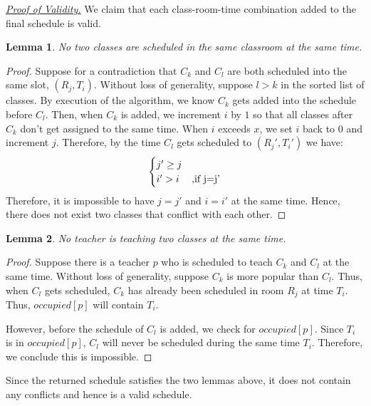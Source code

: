 \documentclass[11pt, oneside]{article}   	%
\newtheorem*{lem}{Lemma}
\begin{document}
\underline{\textit{Proof of Validity.}}
We claim that each class-room-time combination added to the final schedule is valid. \\ \par
\begin{lem}No two classes are scheduled in the same classroom at the same time.\end{lem}
\begin{proof}Suppose for a contradiction that $C_k$ and $C_l$ are both scheduled into the same slot, $(R_j, T_i)$. Without loss of generality, suppose $l>k$ in the sorted list of classes. By execution of the algorithm, we know $C_k$ gets added into the schedule before $C_l$. Then, when $C_k$ is added, we increment $i$ by $1$ so that all classes after $C_k$ don't get assigned to the same time. When $i$ exceeds $x$, we set $i$ back to $0$ and increment $j$. Therefore, by the time $C_l$ gets scheduled to $(R_j', T_i')$ we have:
\[ \begin{cases} j'\geq j \\i'>i& \text{,if } $j=j'$ \end{cases}\]
Therefore, it is impossible to have $j=j'$ and $i=i'$ at the same time. Hence, there does not exist two classes that conflict with each other. \end{proof}
\begin{lem}No teacher is teaching two classes at the same time.\end{lem}
\begin{proof}Suppose there is a teacher $p$ who is scheduled to teach $C_k$ and $C_l$ at the same time. Without loss of generality, suppose $C_k$ is more popular than $C_l$. Thus, when $C_l$ gets scheduled, $C_k$ has already been scheduled in room $R_j$ at time $T_i$. Thus, $occupied[p]$ will contain $T_i$.\par
However, before the schedule of $C_l$ is added, we check for $occupied[p]$. Since $T_i$ is in $occupied[p]$, $C_l$ will never be scheduled during the same time $T_i$. Therefore, we conclude this is impossible. 
\end{proof}
Since the returned schedule satisfies the two lemmas above, it does not contain any conflicts and hence is a valid schedule.
\end{document}
